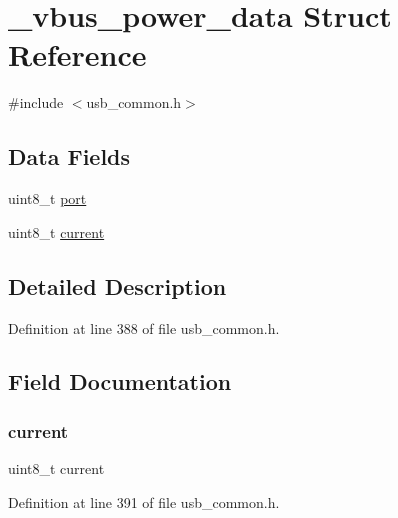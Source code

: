 \hypertarget{struct__vbus__power__data}{}\section{\+\_\+vbus\+\_\+power\+\_\+data Struct Reference}
\label{struct__vbus__power__data}


{\ttfamily \#include $<$usb\+\_\+common.\+h$>$}

\subsection*{Data Fields}
\begin{DoxyCompactItemize}
\item 
uint8\+\_\+t \mbox{\hyperlink{struct__vbus__power__data_a2fa54f9024782843172506fadbee2ac8}{port}}
\item 
uint8\+\_\+t \mbox{\hyperlink{struct__vbus__power__data_a50f63c1ee4d6aebea66e795845c5aba5}{current}}
\end{DoxyCompactItemize}


\subsection{Detailed Description}


Definition at line 388 of file usb\+\_\+common.\+h.



\subsection{Field Documentation}
\mbox{\label{struct__vbus__power__data_a50f63c1ee4d6aebea66e795845c5aba5}} 
\subsubsection{\texorpdfstring{current}{current}}
{\footnotesize\ttfamily uint8\+\_\+t current}



Definition at line 391 of file usb\+\_\+common.\+h.

\mbox{\label{struct__vbus__power__data_a2fa54f9024782843172506fadbee2ac8}} 
